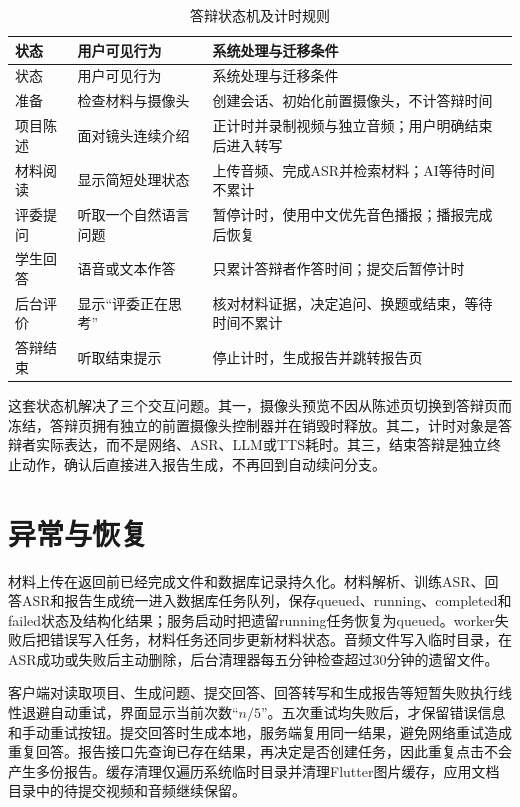 \begin{longtable}{p{2.5cm}p{4.0cm}p{7.6cm}}
\caption{答辩状态机及计时规则}\\
\toprule 状态 & 用户可见行为 & 系统处理与迁移条件 \\
\midrule
\endfirsthead
\toprule 状态 & 用户可见行为 & 系统处理与迁移条件 \\
\midrule
\endhead
准备 & 检查材料与摄像头 & 创建会话、初始化前置摄像头，不计答辩时间 \\
项目陈述 & 面对镜头连续介绍 & 正计时并录制视频与独立音频；用户明确结束后进入转写 \\
材料阅读 & 显示简短处理状态 & 上传音频、完成ASR并检索材料；AI等待时间不累计 \\
评委提问 & 听取一个自然语言问题 & 暂停计时，使用中文优先音色播报；播报完成后恢复 \\
学生回答 & 语音或文本作答 & 只累计答辩者作答时间；提交后暂停计时 \\
后台评价 & 显示“评委正在思考” & 核对材料证据，决定追问、换题或结束，等待时间不累计 \\
答辩结束 & 听取结束提示 & 停止计时，生成报告并跳转报告页 \\
\bottomrule
\end{longtable}

这套状态机解决了三个交互问题。其一，摄像头预览不因从陈述页切换到答辩页而冻结，答辩页拥有独立的前置摄像头控制器并在销毁时释放。其二，计时对象是答辩者实际表达，而不是网络、ASR、LLM或TTS耗时。其三，结束答辩是独立终止动作，确认后直接进入报告生成，不再回到自动续问分支。

\section{异常与恢复}
材料上传在返回前已经完成文件和数据库记录持久化。材料解析、训练ASR、回答ASR和报告生成统一进入数据库任务队列，保存queued、running、completed和failed状态及结构化结果；服务启动时把遗留running任务恢复为queued。worker失败后把错误写入任务，材料任务还同步更新材料状态。音频文件写入临时目录，在ASR成功或失败后主动删除，后台清理器每五分钟检查超过30分钟的遗留文件。

客户端对读取项目、生成问题、提交回答、回答转写和生成报告等短暂失败执行线性退避自动重试，界面显示当前次数“$n/5$”。五次重试均失败后，才保留错误信息和手动重试按钮。提交回答时生成本地，服务端复用同一结果，避免网络重试造成重复回答。报告接口先查询已存在结果，再决定是否创建任务，因此重复点击不会产生多份报告。缓存清理仅遍历系统临时目录并清理Flutter图片缓存，应用文档目录中的待提交视频和音频继续保留。

